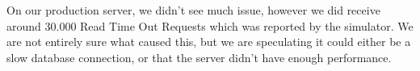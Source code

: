 On our production server, we didn't see much issue, however we did receive around 30.000 Read Time Out Requests which was reported by the simulator. We are not entirely sure what caused this, but we are speculating it could either be a slow database connection, or that the server didn't have enough performance.

